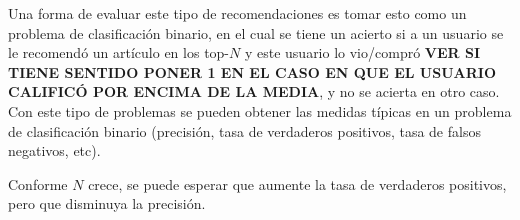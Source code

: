Una forma de evaluar este tipo de recomendaciones es tomar esto como un problema de clasificación binario, en el cual se tiene un acierto si a un usuario se le recomendó un artículo en los top-$N$ y este usuario lo vio/compró \textbf{VER SI TIENE SENTIDO PONER 1 EN EL CASO EN QUE EL USUARIO CALIFICÓ POR ENCIMA DE LA MEDIA}, y no se acierta en otro caso. Con este tipo de problemas se pueden obtener las medidas típicas en un problema de clasificación binario (precisión, tasa de verdaderos positivos, tasa de falsos negativos, etc).

Conforme $N$ crece, se puede esperar que aumente la tasa de verdaderos positivos, pero que disminuya la precisión.










